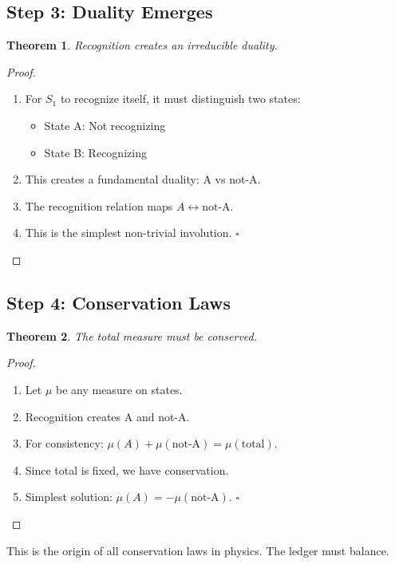 \documentclass[12pt,a4paper]{article}
\newtheorem{theorem}{Theorem}
\begin{document}
\subsection{Step 3: Duality Emerges}

\begin{theorem}
Recognition creates an irreducible duality.
\end{theorem}

\begin{proof}
\begin{enumerate}
\item For $S_1$ to recognize itself, it must distinguish two states:
   \begin{itemize}
   \item State A: Not recognizing
   \item State B: Recognizing
   \end{itemize}
\item This creates a fundamental duality: A vs not-A.
\item The recognition relation maps $A \leftrightarrow \text{not-A}$.
\item This is the simplest non-trivial involution. $\square$
\end{enumerate}
\end{proof}

\subsection{Step 4: Conservation Laws}

\begin{theorem}
The total measure must be conserved.
\end{theorem}

\begin{proof}
\begin{enumerate}
\item Let $\mu$ be any measure on states.
\item Recognition creates A and not-A.
\item For consistency: $\mu(A) + \mu(\text{not-A}) = \mu(\text{total})$.
\item Since total is fixed, we have conservation.
\item Simplest solution: $\mu(A) = -\mu(\text{not-A})$. $\square$
\end{enumerate}
\end{proof}

This is the origin of all conservation laws in physics. The ledger must balance.
\end{document}
